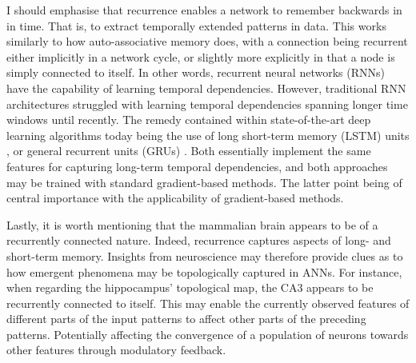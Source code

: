 I should emphasise that recurrence enables a network to remember backwards in in time. That is, to extract temporally extended patterns in data. This works similarly to how auto-associative memory does, with a connection being recurrent either implicitly in a network cycle, or slightly more explicitly in that a node is simply connected to itself. In other words, recurrent neural networks (RNNs) have the capability of learning temporal dependencies. However, traditional RNN architectures struggled with learning temporal dependencies spanning longer time windows until recently. The remedy contained within state-of-the-art deep learning algorithms today being the use of long short-term memory (LSTM) units \citet{Hochreiter1997}, or general recurrent units (GRUs) \citep{Cho2014}. Both essentially implement the same features for capturing long-term temporal dependencies, and both approaches may be trained with standard gradient-based methods. The latter point being of central importance with the applicability of gradient-based methods.

Lastly, it is worth mentioning that the mammalian brain appears to be of a recurrently connected nature. Indeed, recurrence captures aspects of long- and short-term memory. Insights from neuroscience may therefore provide clues as to how emergent phenomena may be topologically captured in ANNs.
For instance, when regarding the hippocampus' topological map, the CA3 appears to be recurrently connected to itself. This may enable the currently observed features of different parts of the input patterns to affect other parts of the preceding patterns. Potentially affecting the convergence of a population of neurons towards other features through modulatory feedback.
\\

